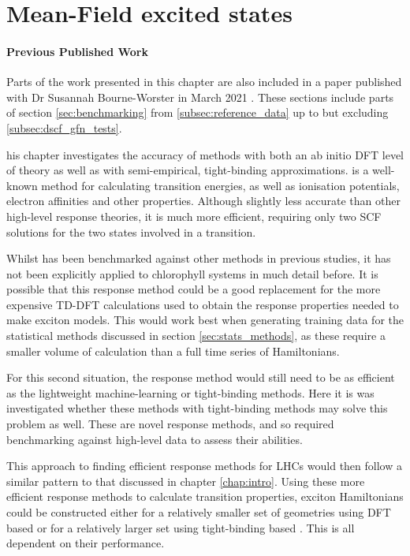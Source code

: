 %
%
\chapter{Mean-Field excited states}
\label{chap:dscf}

\subsubsection*{Previous Published Work}
Parts of the work presented in this chapter are also included in a paper published 
with Dr Susannah Bourne-Worster in March 2021 \cite{Worster2021}. These sections
include parts of section \ref{sec:benchmarking} from \ref{subsec:reference_data}
up to but excluding \ref{subsec:dscf_gfn_tests}.

his chapter investigates the accuracy of \dscf methods with both an 
ab initio DFT level of theory as well as with semi-empirical, tight-binding approximations.
\dscf is a well-known method for calculating transition energies, as well as
ionisation potentials, electron affinities and other properties. Although slightly
less accurate than other high-level response theories, it is much more efficient,
requiring only two SCF solutions for the two states involved in a transition. 

Whilst \dscf has been benchmarked against other methods in previous studies, it
has not been explicitly applied to chlorophyll systems in much detail before. It
is possible that this response method could be a good replacement for the more expensive
TD-DFT calculations used to obtain the response properties needed to make exciton
models. This would work best when generating training data for the statistical methods
discussed in section \ref{sec:stats_methods}, as these require a smaller volume
of calculation than a full time series of Hamiltonians.

For this second situation, the response method would still need to be as efficient
as the lightweight machine-learning or tight-binding methods. Here it is was investigated
whether these \dscf methods with tight-binding methods may solve this problem as
well. These are novel response methods, and so required benchmarking against high-level 
data to assess their abilities.

This approach to finding efficient response methods for LHCs would then follow a
similar pattern to that discussed in chapter \ref{chap:intro}. Using these more
efficient response methods to calculate transition properties, exciton Hamiltonians
could be constructed either for a relatively smaller set of geometries using DFT
based \dscf or for a relatively larger set using tight-binding based \dscf. This
is all dependent on their performance.

